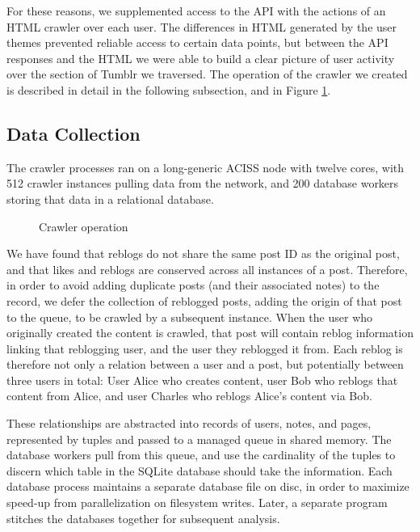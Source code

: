 For these reasons, we supplemented access to the API with the actions 
of an HTML crawler over each user.  The differences in HTML generated 
by the user themes prevented reliable access to certain data points, 
but between the API responses and the HTML we were able to build a 
clear picture of user activity over the section of Tumblr we 
traversed.  The operation of the crawler we created is described 
in detail in the following subsection, and in Figure \ref{crawler}.

\subsection{Data Collection}

The crawler processes ran on a long-generic ACISS node with twelve 
cores, with 512 crawler instances pulling data from the network, 
and 200 database workers storing that data in a relational database.

\begin{figure}
  
  \caption{Crawler operation}\label{crawler}
\end{figure}

We have found that reblogs do not share the same post ID as the original 
post, and that likes and reblogs are conserved across all instances of 
a post.  Therefore, in order to avoid adding duplicate posts (and their 
associated notes) to the record, we defer the collection of reblogged 
posts, adding the origin of that post to the queue, to be crawled by a 
subsequent instance.  When the user who originally created the content 
is crawled, that post will contain reblog information linking that 
reblogging user, and the user they reblogged it from.  
Each reblog is therefore not only a relation between a user and a post, 
but potentially between three users in total: User Alice who creates 
content, user Bob who reblogs that content from Alice, and user Charles 
who reblogs Alice's content via Bob.


These relationships are abstracted into records of users, notes, and pages, 
represented by tuples and passed to a managed queue in 
shared memory.  The database workers pull from this queue, and use 
the cardinality of the tuples to discern which table in the SQLite 
database should take the information.  Each database process 
maintains a separate database file on disc, in order to maximize 
speed-up from parallelization on filesystem writes.  Later, a 
separate program stitches the databases together for subsequent 
analysis.

